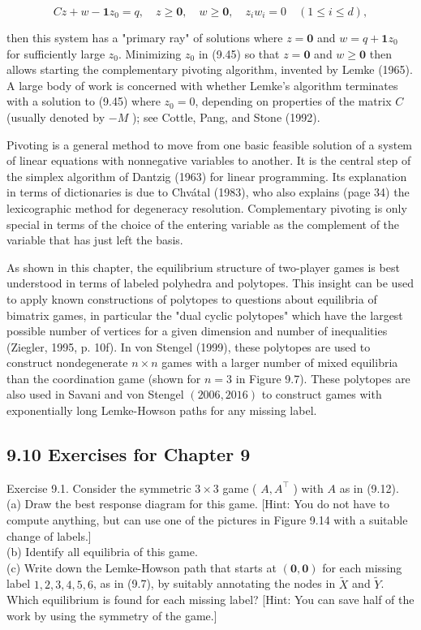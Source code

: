 \documentclass[12pt]{article}
\begin{document}
\begin{equation*}
C z+w-\mathbf{1} z_{0}=q, \quad z \geq \mathbf{0}, \quad w \geq \mathbf{0}, \quad z_{i} w_{i}=0 \quad(1 \leq i \leq d), \tag{9.45}
\end{equation*}


then this system has a "primary ray" of solutions where $z=\mathbf{0}$ and $w=q+\mathbf{1} z_{0}$ for sufficiently large $z_{0}$. Minimizing $z_{0}$ in (9.45) so that $z=\mathbf{0}$ and $w \geq \mathbf{0}$ then allows starting the complementary pivoting algorithm, invented by Lemke (1965). A large body of work is concerned with whether Lemke's algorithm terminates with a solution to (9.45) where $z_{0}=0$, depending on properties of the matrix $C$ (usually denoted by $-M$ ); see Cottle, Pang, and Stone (1992).

Pivoting is a general method to move from one basic feasible solution of a system of linear equations with nonnegative variables to another. It is the central step of the simplex algorithm of Dantzig (1963) for linear programming. Its explanation in terms of dictionaries is due to Chvátal (1983), who also explains (page 34) the lexicographic method for degeneracy resolution. Complementary pivoting is only special in terms of the choice of the entering variable as the complement of the variable that has just left the basis.

As shown in this chapter, the equilibrium structure of two-player games is best understood in terms of labeled polyhedra and polytopes. This insight can be used to apply known constructions of polytopes to questions about equilibria of bimatrix games, in particular the "dual cyclic polytopes" which have the largest possible number of vertices for a given dimension and number of inequalities (Ziegler, 1995, p. 10f). In von Stengel (1999), these polytopes are used to construct nondegenerate $n \times n$ games with a larger number of mixed equilibria than the coordination game (shown for $n=3$ in Figure 9.7). These polytopes are also used in Savani and von Stengel $(2006,2016)$ to construct games with exponentially long Lemke-Howson paths for any missing label.

\subsection*{9.10 Exercises for Chapter 9}
Exercise 9.1. Consider the symmetric $3 \times 3$ game ( $A, A^{\top}$ ) with $A$ as in (9.12).\\[0pt]
(a) Draw the best response diagram for this game. [Hint: You do not have to compute anything, but can use one of the pictures in Figure 9.14 with a suitable change of labels.]\\
(b) Identify all equilibria of this game.\\
(c) Write down the Lemke-Howson path that starts at $(\mathbf{0}, \mathbf{0})$ for each missing label $1,2,3,4,5,6$, as in (9.7), by suitably annotating the nodes in $\tilde{X}$ and $\tilde{Y}$. Which equilibrium is found for each missing label? [Hint: You can save half of the work by using the symmetry of the game.]
\end{document}

